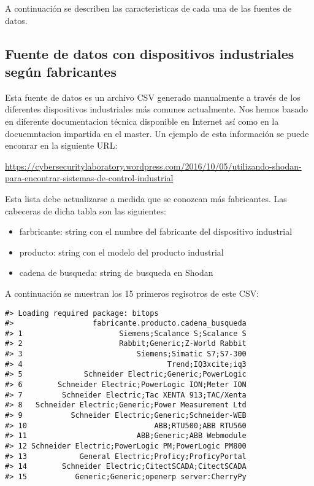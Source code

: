 \documentclass[]{article}
\providecommand{\tightlist}{%
  \setlength{\itemsep}{0pt}\setlength{\parskip}{0pt}}
\begin{document}
A continuación se describen las caracteristicas de cada una de las
fuentes de datos.

\subsection{Fuente de datos con dispositivos industriales según
fabricantes}\label{fuente-de-datos-con-dispositivos-industriales-segun-fabricantes}

Esta fuente de datos es un archivo CSV generado manualmente a través de
los diferentes dispositivos industriales más comunes actualmente. Nos
hemos basado en diferente documentacion técnica disponible en Internet
así como en la docuemntacion impartida en el master. Un ejemplo de esta
información se puede enconrar en la siguiente URL:

\url{https://cybersecuritylaboratory.wordpress.com/2016/10/05/utilizando-shodan-para-encontrar-sistemas-de-control-industrial}

Esta lista debe actualizarse a medida que se conozcan más fabricantes.
Las cabeceras de dicha tabla son las siguientes:

\begin{itemize}
\tightlist
\item
  farbricante: string con el numbre del fabricante del dispositivo
  industrial
\item
  producto: string con el modelo del producto industrial
\item
  cadena de busqueda: string de busqueda en Shodan
\end{itemize}

A continuación se muestran los 15 primeros regisotros de este CSV:

\begin{verbatim}
#> Loading required package: bitops
#>                  fabricante.producto.cadena_busqueda
#> 1                      Siemens;Scalance S;Scalance S
#> 2                      Rabbit;Generic;Z-World Rabbit
#> 3                          Siemens;Simatic S7;S7-300
#> 4                                 Trend;IQ3xcite;iq3
#> 5              Schneider Electric;Generic;PowerLogic
#> 6        Schneider Electric;PowerLogic ION;Meter ION
#> 7         Schneider Electric;Tac XENTA 913;TAC/Xenta
#> 8   Schneider Electric;Generic;Power Measurement Ltd
#> 9           Schneider Electric;Generic;Schneider-WEB
#> 10                             ABB;RTU500;ABB RTU560
#> 11                         ABB;Generic;ABB Webmodule
#> 12 Schneider Electric;PowerLogic PM;PowerLogic PM800
#> 13            General Electric;Proficy;ProficyPortal
#> 14        Schneider Electric;CitectSCADA;CitectSCADA
#> 15           Generic;Generic;openerp server:CherryPy
\end{verbatim}
\end{document}
